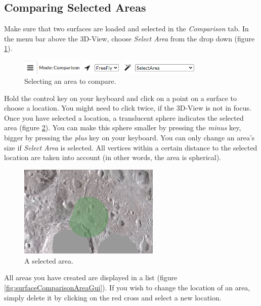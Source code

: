 \subsection{Comparing Selected Areas}

Make sure that two surfaces are loaded and selected in the \emph{Comparison} tab. In the menu bar above the 3D-View, choose \emph{Select Area} from the drop down (figure \ref{fig:surfaceComparisonAreaSelection}).

\begin{figure}[h]
	\centering
	\includegraphics[width=0.8\textwidth]{pics/surfaceComparisonSelectArea.PNG}
	\caption[Selecting an area to compare.]{Selecting an area to compare.}
	\label{fig:surfaceComparisonAreaSelection}
\end{figure}

Hold the control key on your keyboard and click on a point on a surface to choose a location. You might need to click twice, if the 3D-View is not in focus. Once you have selected a location, a translucent sphere indicates the selected area (figure \ref{fig:surfaceComparisonAreaSphere}). You can make this sphere smaller by pressing the \emph{minus} key, bigger by pressing the \emph{plus} key on your keyboard. You can only change an area's size if \emph{Select Area} is selected. All vertices within a certain distance to the selected location are taken into account (in other words, the area is spherical).

\begin{figure}[h]
	\centering
	\includegraphics[width=0.6\textwidth]{pics/surfaceComparisonAreaSphere.PNG}
	\caption[A selected area.]{A selected area.}
	\label{fig:surfaceComparisonAreaSphere}
\end{figure}

All areas you have created are displayed in a list (figure \ref{fig:surfaceComparisonAreaGui}). If you wish to change the location of an area, simply delete it by clicking on the red cross and select a new location. 

